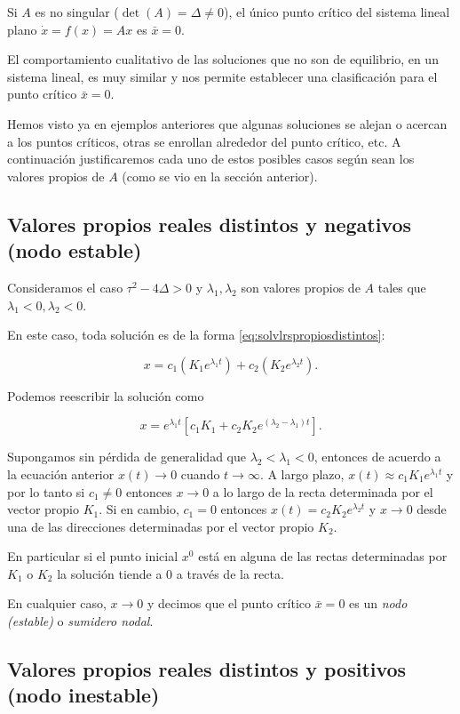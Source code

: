 \documentclass[11pt]{book}
\theoremstyle{definition}
\numberwithin{definition}{section}
\theoremstyle{theorem}
\numberwithin{theorem}{section}
\numberwithin{lemma}{section}
\numberwithin{corollary}{section}
\theoremstyle{plain}
\numberwithin{example}{section}
\begin{document}
Si $A$ es no singular ($\det(A) = \Delta \neq 0$), el único punto crítico del sistema lineal plano $\dot{x} = f(x) = Ax$ es $\bar{x} = 0$.

El comportamiento cualitativo de las soluciones que no son de equilibrio, en un sistema lineal, es muy similar y nos permite establecer una clasificación para el punto crítico $\bar{x} = 0$.

Hemos visto ya en ejemplos anteriores que algunas soluciones se alejan o acercan a los puntos críticos, otras se enrollan alrededor del punto crítico, etc. A continuación justificaremos cada uno de estos posibles casos según sean los valores propios de $A$ (como se vio en la sección anterior).

\subsection{Valores propios reales distintos y negativos (nodo estable)}
Consideramos el caso $\tau^2 - 4\Delta > 0$ y $\lambda_1, \lambda_2$ son valores propios de $A$ tales que $\lambda_1 < 0, \lambda_2 < 0$.

En este caso, toda solución es de la forma \ref{eq:solvlrspropiosdistintos}:

$$ x = c_1(K_1 e^{\lambda_1 t}) + c_2(K_2 e^{\lambda_2 t}). $$

Podemos reescribir la solución como

$$ x = e^{\lambda_1 t} [ c_1 K_1 + c_2K_2 e^{(\lambda_2 - \lambda_1)t} ].$$

Supongamos sin pérdida de generalidad que $\lambda_2 < \lambda_1 < 0$, entonces de acuerdo a la ecuación anterior $x(t) \to 0$ cuando $t \to \infty$.
A largo plazo, $x(t) \approx c_1K_1e^{\lambda_1 t}$ y por lo tanto si $c_1 \neq 0$ entonces $x \to 0$ a lo largo de la recta determinada por el vector propio $K_1$.
Si en cambio, $c_1 = 0$ entonces $x(t) = c_2 K_2 e^{\lambda_2 t}$ y $x \to 0$ desde una de las direcciones determinadas por el vector propio $K_2$.

En particular si el punto inicial $x^0$ está en alguna de las rectas determinadas por $K_1$ o $K_2$ la solución tiende a 0 a través de la recta.

En cualquier caso, $x \to 0$ y decimos que el punto crítico $\bar{x} = 0$ es un \emph{nodo (estable)} o \emph{sumidero nodal}.

\subsection{Valores propios reales distintos y positivos (nodo inestable)}
\end{document}
